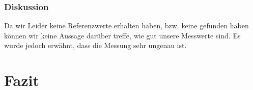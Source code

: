 \documentclass[12px]{scrartcl}
\begin{document}
\subsubsection{Diskussion}
Da wir Leider keine Referenzwerte erhalten haben, bzw. keine gefunden haben können wir keine Aussage darüber treffe, wie gut unsere Messwerte sind. Es wurde jedoch erwähnt, dass die Messung sehr ungenau ist.

\section{Fazit}

\end{document}
